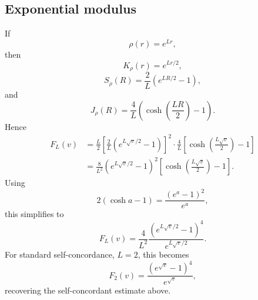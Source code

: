 \documentclass[11pt]{article}
\begin{document}
\subsection*{Exponential modulus}

If
\[
    \rho(r)=e^{Lr},
\]
then
\[
    K_\rho(r)=e^{Lr/2},
\]
\[
    S_\rho(R)
    =
    \frac{2}{L}
    \left(e^{LR/2}-1\right),
\]
and
\[
    J_\rho(R)
    =
    \frac{4}{L}
    \left(
        \cosh\left(\frac{LR}{2}\right)-1
    \right).
\]
Hence
\[
\begin{aligned}
    F_L(v)
    &=
    \frac{L}{2}
    \left[
        \frac{2}{L}
        \left(e^{L\sqrt v/2}-1\right)
    \right]^2
    \cdot
    \frac{4}{L}
    \left[
        \cosh\left(\frac{L\sqrt v}{2}\right)-1
    \right]  \\
    &=
    \frac{8}{L^2}
    \left(e^{L\sqrt v/2}-1\right)^2
    \left[
        \cosh\left(\frac{L\sqrt v}{2}\right)-1
    \right].
\end{aligned}
\]
Using
\[
    2(\cosh a-1)=\frac{(e^a-1)^2}{e^a},
\]
this simplifies to
\[
    F_L(v)
    =
    \frac{4}{L^2}
    \frac{
        \left(e^{L\sqrt v/2}-1\right)^4
    }{
        e^{L\sqrt v/2}
    }.
\]
For standard self-concordance, \(L=2\), this becomes
\[
    F_2(v)
    =
    \frac{(e^{\sqrt v}-1)^4}{e^{\sqrt v}},
\]
recovering the self-concordant estimate above.
\end{document}
